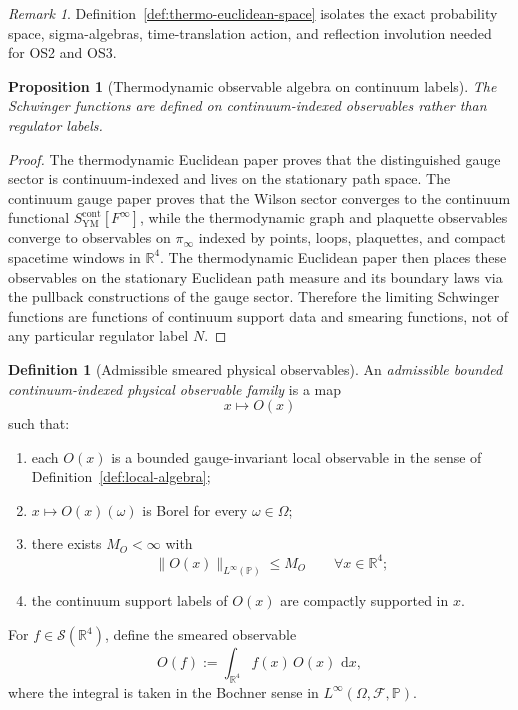 \documentclass[11pt]{article}
\newtheorem{proposition}[theorem]{Proposition}
\theoremstyle{definition}
\newtheorem{definition}[theorem]{Definition}
\theoremstyle{remark}
\newtheorem{remark}[theorem]{Remark}
\newcommand{\R}{\mathbb R}
\newcommand{\dd}{\,\mathrm d}
\begin{document}
\begin{remark}
Definition~\ref{def:thermo-euclidean-space} isolates the exact probability space, sigma-algebras,
time-translation action, and reflection involution needed for OS2 and OS3.
\end{remark}

\begin{proposition}[Thermodynamic observable algebra on continuum labels]
\label{prop:continuum-observable-algebra}
The Schwinger functions are defined on continuum-indexed
observables rather than regulator labels.
\end{proposition}

\begin{proof}
The thermodynamic Euclidean paper proves that the distinguished gauge sector is
continuum-indexed and lives on the stationary path space.  The continuum gauge
paper proves that the Wilson sector converges to the continuum functional
$S_{\mathrm{YM}}^{\mathrm{cont}}[F^\infty]$, while the thermodynamic graph and
plaquette observables converge to observables on $\pi_\infty$ indexed by points,
loops, plaquettes, and compact spacetime windows in $\R^4$.  The thermodynamic
Euclidean paper then places these observables on the stationary Euclidean path
measure and its boundary laws via the pullback constructions of the gauge
sector.
Therefore the limiting Schwinger functions are functions of continuum support
data and smearing functions, not of any particular regulator label $N$.
\end{proof}

\begin{definition}[Admissible smeared physical observables]
\label{def:admissible-smeared}
An \emph{admissible bounded continuum-indexed physical observable family} is a
map
\[
x\longmapsto O(x)
\]
such that:
\begin{enumerate}[label=\textnormal{(\roman*)},leftmargin=1.5em]
\item each \(O(x)\) is a bounded gauge-invariant local observable in the sense
of Definition~\ref{def:local-algebra};
\item \(x\mapsto O(x)(\omega)\) is Borel for every \(\omega\in\Omega\);
\item there exists \(M_O<\infty\) with
\[
\|O(x)\|_{L^\infty(\mathbb P)}\le M_O
\qquad
\forall x\in\R^4;
\]
\item the continuum support labels of \(O(x)\) are compactly supported in \(x\).
\end{enumerate}
For \(f\in\mathcal S(\R^4)\), define the smeared observable
\[
O(f):=\int_{\R^4} f(x)\,O(x)\,\dd x,
\]
where the integral is taken in the Bochner sense in
\(L^\infty(\Omega,\mathcal F,\mathbb P)\).
\end{definition}
\end{document}
